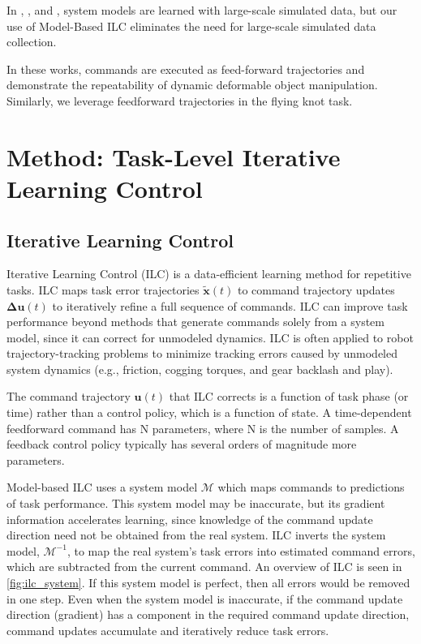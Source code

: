 \documentclass[conference]{IEEEtran}
\newcommand{\commandt}{\mathbf{u}(t)}
\newcommand{\commandupdate}{\mathbf{\Delta u}(t)}
\newcommand{\stateerror}{\mathbf{\tilde{x}}(t)}
\newcommand{\model}{\mathcal{M}}
\newcommand{\invmodel}{\mathcal{M}^{-1}}
\begin{document}
In \citet{ha2021flingbotunreasonableeffectivenessdynamic}, \citet{chi_iterative_2022}, and \citet{zhang_robots_2024}, system models are learned with large-scale simulated data, but our use of Model-Based ILC eliminates the need for large-scale simulated data collection. 

In these works, commands are executed as feed-forward trajectories and demonstrate the repeatability of dynamic deformable object manipulation. Similarly, we leverage feedforward trajectories in the flying knot task.

\section{Method: Task-Level Iterative Learning Control}

\subsection{Iterative Learning Control}
Iterative Learning Control (ILC) is a data-efficient learning method for repetitive tasks. ILC maps task error trajectories $\stateerror$ to command trajectory updates $\commandupdate$ to iteratively refine a full sequence of commands. ILC can improve task performance beyond methods that generate commands solely from a system model, since it can correct for unmodeled dynamics. 
ILC is often applied to robot trajectory-tracking problems to minimize tracking errors caused by unmodeled system dynamics (e.g., friction, cogging torques, and gear backlash and play).

The command trajectory $\commandt$ that ILC corrects is a function of task phase (or time) rather than a control policy, which is a function of state. 
A time-dependent feedforward command has N parameters, where N is the number of samples. A feedback control policy typically has several orders of magnitude more
parameters.

Model-based ILC uses a system model $\model$ which maps commands to predictions of task performance. This system model may be inaccurate, but its gradient information accelerates learning, since knowledge of the command update direction need not be obtained from the real system. ILC inverts the system model, $\invmodel$, to map the real system's task errors into estimated command errors, which are subtracted from the current command. An overview of ILC is seen in \cref{fig:ilc_system}.
If this system model is perfect, then all errors would be removed in one step. Even when the system model is inaccurate, if the command update direction (gradient) has a component in the required command update direction, command updates accumulate and iteratively reduce task errors. 
\end{document}
